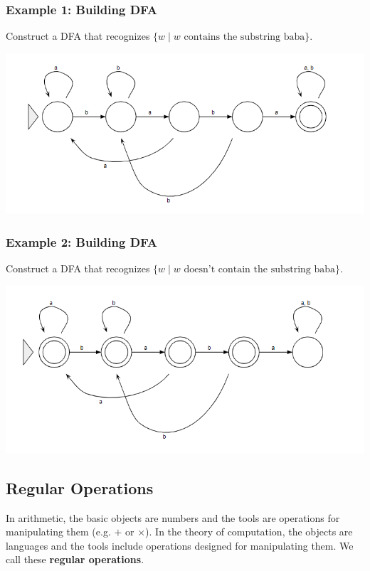 \documentclass[letterpaper]{article}
\begin{document}
\subsubsection{Example 1: Building DFA}
Construct a DFA that recognizes $\{w \mid w \text{ contains the substring baba}\}$.

\begin{mdframed}[nobreak=true]
    \begin{center}
        \includegraphics[scale=0.7]{assets/baba_state.png}
    \end{center}
\end{mdframed}

\subsubsection{Example 2: Building DFA}
Construct a DFA that recognizes $\{w \mid w \text{ doesn't contain the substring baba}\}$.

\begin{mdframed}[nobreak=true]
    \begin{center}
        \includegraphics[scale=0.7]{assets/not_baba_state.png}
    \end{center}
\end{mdframed}

\subsection{Regular Operations}
In arithmetic, the basic objects are numbers and the tools are operations for manipulating them (e.g. $+$ or $\times$). In the theory of computation, the objects are languages and the tools include operations designed for manipulating them. We call these \textbf{regular operations}.
\end{document}

